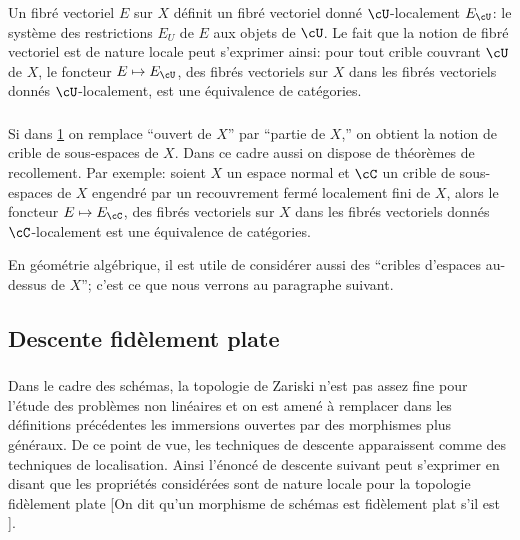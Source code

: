 \subsubsection{}\label{I:1-3-3}

Un fibré vectoriel $E$ sur $X$ définit un fibré vectoriel donné 
$\cU$-localement $E_\cU$: le système des restrictions $E_U$ de $E$ aux objets 
de $\cU$. Le fait que la notion de fibré vectoriel est de nature locale peut 
s'exprimer ainsi: pour tout crible couvrant $\cU$ de $X$, le foncteur 
$E\mapsto E_\cU$, des fibrés vectoriels sur $X$ dans les fibrés vectoriels 
donnés $\cU$-localement, est une équivalence de catégories. 





\subsubsection{}\label{I:1-3-4}

Si dans \hyperref[I:1-1]{1} on remplace ``ouvert de $X$'' par ``partie de 
$X$,'' on obtient la notion de crible de sous-espaces de $X$. Dans ce cadre 
aussi on dispose de théorèmes de recollement. Par exemple: soient $X$ un 
espace normal et $\cC$ un crible de sous-espaces de $X$ engendré par un recouvrement 
fermé localement fini de $X$, alors le foncteur $E\mapsto E_\cC$, des fibrés 
vectoriels sur $X$ dans les fibrés vectoriels donnés $\cC$-localement est une 
équivalence de catégories. 

En géométrie algébrique, il est utile de considérer aussi des ``cribles 
d'espaces au-dessus de $X$''; c'est ce que nous verrons au paragraphe suivant. 










\subsection{Descente fidèlement plate}\label{I:1-4}





\subsubsection{}\label{I:1-4-1}

Dans le cadre des schémas, la topologie de Zariski n'est pas assez fine pour 
l'étude des problèmes non linéaires et on est amené à remplacer dans les 
définitions précédentes les immersions ouvertes par des morphismes plus 
généraux. De ce point de vue, les techniques de descente apparaissent comme des 
techniques de localisation. Ainsi l'énoncé de descente suivant peut s'exprimer 
en disant que les propriétés considérées sont de nature locale pour la 
topologie fidèlement plate [On dit qu'un morphisme de schémas est fidèlement 
plat s'il est ]. 



